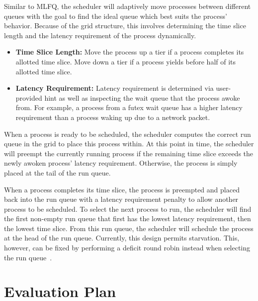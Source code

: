 \documentclass[letterpaper,twocolumn,10pt]{article}
\begin{document}
Similar to MLFQ, the scheduler will adaptively move processes between different
queues with the goal to find the ideal queue which best suits the process'
behavior. Because of the grid structure, this involves determining the time
slice length and the latency requirement of the process dynamically. 

\begin{itemize}
  \item \textbf{Time Slice Length:} Move the process up a tier if a process
                                    completes its allotted time slice. Move down
                                    a tier if a process yields before half of
                                    its allotted time slice.
  \item \textbf{Latency Requirement:} Latency requirement is determined via
                                      user-provided hint as well as inspecting
                                      the wait queue that the process awoke from.
                                      For example, a process from a futex wait
                                      queue has a higher latency requirement than
                                      a process waking up due to a network packet.
\end{itemize}

When a process is ready to be scheduled, the scheduler computes the correct
run queue in the grid to place this process within. At this point in time,
the scheduler will preempt the currently running process if the remaining time
slice exceeds the newly awoken process' latency requirement. Otherwise, the
process is simply placed at the tail of the run queue.

When a process completes its time slice, the process is preempted and placed
back into the run queue with a latency requirement penalty to allow another
process to be scheduled. To select the next process to run, the scheduler
will find the first non-empty run queue that first has the lowest latency 
requirement, then the lowest time slice. From this run queue, the scheduler
will schedule the process at the head of the run queue. Currently, this design 
permits starvation. This, however, can be fixed by performing a deficit round 
robin instead when selecting the run queue~\cite{DRR}. 



\section{Evaluation Plan}
\label{sec:evaluation}
\end{document}
